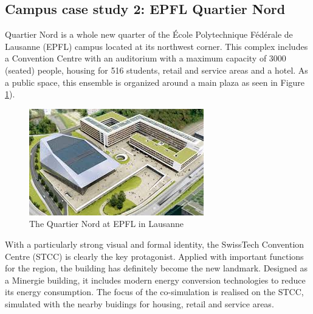 \documentclass{tBPS2e}
\theoremstyle{plain}
\theoremstyle{definition}
\theoremstyle{remark}
\begin{document}





\subsection{Campus case study 2: EPFL Quartier Nord}
Quartier Nord is a whole new quarter of the École Polytechnique Fédérale de Lausanne (EPFL) campus located at its northwest corner. This complex includes a Convention Centre with an auditorium with a maximum capacity of 3000 (seated) people, housing for 516 students, retail and service areas and a hotel. As a public space, this ensemble is organized around a main plaza as seen in  Figure \ref{fig:quartier_nord_1}).

\begin{figure}[H]
\centering
\includegraphics[]{figures/quartier_nord_1}
\caption{The Quartier Nord at EPFL in Lausanne}
\label{fig:quartier_nord_1}
\end{figure}

With a particularly strong visual and formal identity, the SwissTech Convention Centre (STCC) is clearly the key protagonist. Applied with important functions for the region, the building has definitely become the new landmark. Designed as a Minergie building, it includes modern energy conversion technologies to reduce its energy consumption. The focus of the co-simulation is realised on the STCC, simulated with the nearby buidings for housing, retail and service areas.
\end{document}
